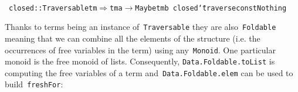 \documentclass[9pt,authoryear]{sigplanconf}
\begin{document}
{\nopagebreak }

%
%
%
~\\~\vphantom{$\{$}\texttt{closed}\texttt{\mbox{\hspace{0.50em}}}\texttt{{:}{:}}\texttt{\mbox{\hspace{0.50em}}}\texttt{Traversable}\texttt{\mbox{\hspace{0.50em}}}\texttt{tm}\texttt{\mbox{\hspace{0.50em}}}\texttt{$ \Rightarrow $}\texttt{\mbox{\hspace{0.50em}}}\texttt{tm}\texttt{\mbox{\hspace{0.50em}}}\texttt{a}\texttt{\mbox{\hspace{0.50em}}}\texttt{$ \rightarrow $}\texttt{\mbox{\hspace{0.50em}}}\texttt{Maybe}\texttt{\mbox{\hspace{0.50em}}}\texttt{\makebox[1.22ex][l]{$ {(} $}}\texttt{tm}\texttt{\mbox{\hspace{0.50em}}}\texttt{b}\texttt{\makebox[1.22ex][r]{$ {)} $}}\texttt{{\nopagebreak \newline%
}\vphantom{$\{$}}\texttt{closed}\texttt{\mbox{\hspace{0.50em}}}\texttt{{\char `\=}}\texttt{\mbox{\hspace{0.50em}}}\texttt{traverse}\texttt{\mbox{\hspace{0.50em}}}\texttt{\makebox[1.22ex][l]{$ {(} $}}\texttt{const}\texttt{\mbox{\hspace{0.50em}}}\texttt{Nothing}\texttt{\makebox[1.22ex][r]{$ {)} $}}\texttt{{\nopagebreak \newline%
}\vphantom{$\{$}}%


%
Thanks to terms being an instance of{~}\texttt{Traversable} they are
    also{~}\texttt{Foldable} meaning that we can combine all the elements of
    the structure (i.e. the occurrences of free variables in the term)
    using any{~}\texttt{Monoid}. One particular monoid is the free monoid of
    lists. Consequently, \texttt{Data.Foldable.toList} is computing the
    free variables of a term and{~}\texttt{Data.Foldable.elem} can be used to
    build{~}\texttt{freshFor}{:}%


{\nopagebreak }
\end{document}

